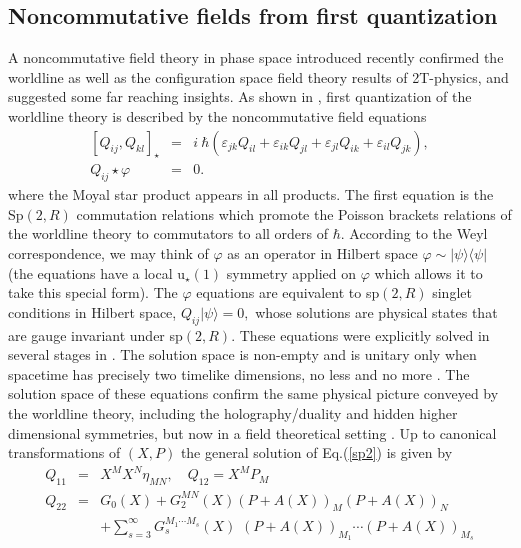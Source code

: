 \documentclass[a4paper,12pt]{article}
\begin{document}
\subsection{Noncommutative fields from first quantization}

A noncommutative field theory in phase space introduced recently \cite{NCSp}
confirmed the worldline as well as the configuration space field theory \cite
{field2T} results of 2T-physics, and suggested some far reaching insights.
As shown in \cite{NCSp}, first quantization of the worldline theory is
described by the noncommutative field equations
\begin{eqnarray}
\left[ Q_{ij},Q_{kl}\right] _{\star } &=& i\ \hbar \left(
\varepsilon _{jk}Q_{il}+\varepsilon _{ik}Q_{jl}+\varepsilon
_{jl}Q_{ik}+\varepsilon
_{il}Q_{jk}\right) ,  \label{sp2} \\
Q_{ij}\star \varphi &=&0.  \label{matter}
\end{eqnarray}
where the Moyal star product appears in all products. The first
equation is the Sp$\left( 2,R\right) $ commutation relations which
promote the Poisson brackets relations of the worldline theory to
commutators to all orders of $ \hbar $. According to the Weyl
correspondence, we may think of $\varphi $ as an operator in
Hilbert space $\varphi \sim |\psi \rangle \langle \psi |$ (the
equations have a local u$_\star (1)$ symmetry applied on $\varphi$
which allows it to take this special form). The $\varphi $
equations are equivalent to sp$\left( 2,R\right) $ singlet
conditions in Hilbert space, $Q_{ij}|\psi \rangle =0,$ whose
solutions are physical states that are gauge invariant under
sp$\left( 2,R\right) .$ These equations were explicitly solved in
several stages in \cite{field2T}\cite {highspin}\cite{NCSp}. The
solution space is non-empty and is unitary only when spacetime has
precisely two timelike dimensions, no less and no more
\cite{NCSp}. The solution space of these equations confirm the
same physical picture conveyed by the worldline theory, including
the holography/duality and hidden higher dimensional symmetries,
but now in a field theoretical setting \cite{field2T}\cite{NCSp}.
Up to canonical transformations of $ \left( X,P\right) $ the
general solution of Eq.(\ref{sp2}) is given by
\begin{eqnarray}
Q_{11} &=&X^{M}X^{N}\eta _{MN},\quad Q_{12}=X^{M}
P_{M} \label{bkg1} \\
Q_{22} &=&G_{0}\left( X\right) +G_{2}^{MN}\left( X\right) \left( P+A\left(
X\right) \right) _{M}\left( P+A\left( X\right) \right) _{N}  \label{bkg2} \\
&&+\sum_{s=3}^{\infty }G_{s}^{M_{1}\cdots M_{s}}\left( X\right) \,\,\left(
P+A\left( X\right) \right) _{M_{1}}\cdots \left( P+A\left( X\right) \right)
_{M_{s}}  \label{bkg3}
\end{eqnarray}
\end{document}
